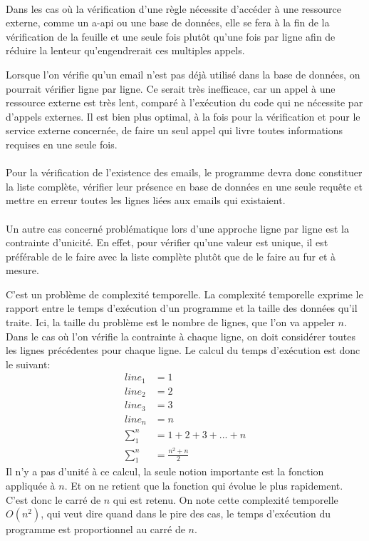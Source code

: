 \paragraph{}
Dans les cas où la vérification d'une règle nécessite d'accéder à une ressource externe, comme un \gls{a-api} ou une base de données,
elle se fera à la fin de la vérification de la feuille et une seule fois plutôt qu'une fois par ligne afin de réduire la lenteur qu'engendrerait ces multiples appels.

Lorsque l'on vérifie qu'un email n'est pas déjà utilisé dans la base de données, on pourrait vérifier ligne par ligne.
Ce serait très inefficace, car un appel à une ressource externe est très lent, comparé à l'exécution du code qui ne nécessite par d'appels externes.
Il est bien plus optimal, à la fois pour la vérification et pour le service externe concernée, de faire un seul appel qui livre toutes informations requises en une seule fois.

\paragraph{}
Pour la vérification de l'existence des emails, le programme devra donc constituer la liste complète, vérifier leur présence en base de données en une seule requête et mettre en erreur toutes les lignes liées aux emails qui existaient.

\paragraph{}
Un autre cas concerné problématique lors d'une approche ligne par ligne est la contrainte d'unicité.
En effet, pour vérifier qu'une valeur est unique, il est préférable de le faire avec la liste complète plutôt que de le faire au fur et à mesure.

C'est un problème de complexité temporelle.
La complexité temporelle exprime le rapport entre le temps d'exécution d'un programme et la taille des données qu'il traite.
Ici, la taille du problème est le nombre de lignes, que l'on va appeler $n$.
Dans le cas où l'on vérifie la contrainte à chaque ligne, on doit considérer toutes les lignes précédentes pour chaque ligne.
Le calcul du temps d'exécution est donc le suivant:
\begin{align}
line_1&= 1 \\
line_2&= 2 \\
line_3&= 3 \\
line_n&= n \\
\sum_1^n &= 1+2+3+...+n \\
\sum_1^n &= \frac{n^2 + n}{2}
\end{align}
Il n'y a pas d'unité à ce calcul, la seule notion importante est la fonction appliquée à $n$.
Et on ne retient que la fonction qui évolue le plus rapidement.
C'est donc le carré de $n$ qui est retenu.
On note cette complexité temporelle $O(n^2)$, qui veut dire quand dans le pire des cas, le temps d'exécution du programme est proportionnel au carré de $n$.

